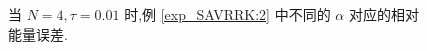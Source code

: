 \documentclass[aspectratio=169]{beamer}
\numberwithin{theorem}{section} %
\begin{document}
\begin{frame}%
	\begin{figure}[H]
		\begin{center}
		\caption{当 $N=4, \tau=0.01$ 时,例 \ref{exp_SAVRRK:2} 中不同的 $\alpha$ 对应的相对能量误差.}
		\label{fig_SAVRRK:2-4}
		\end{center}
		\end{figure}
\end{frame}
\end{document}
